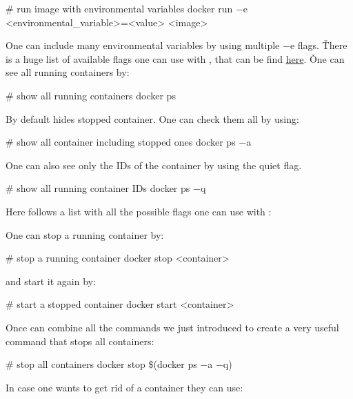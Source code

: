 \begin{bash}
# run image with environmental variables
docker run $-$e <environmental_variable>=<value> <image>
\end{bash}

One can include many environmental variables by using multiple $-$e flags. \v

There is a huge list of available flags one can use with , that can be find
\href{https://docs.docker.com/engine/reference/commandline/run/#options}{here}. \v

One can see all running containers by:

\begin{bash}
# show all running containers
docker ps
\end{bash}

By default  hides stopped container. One can check them all by using:

\begin{bash}
# show all container including stopped ones
docker ps $-$a
\end{bash}

One can also see only the IDs of the container by using the quiet  flag.

\begin{bash}
# show all running container IDs
docker ps $-$q
\end{bash}

Here follows a list with all the possible flags one can use with :


One can stop a running container by:

\begin{bash}
# stop a running container
docker stop <container>
\end{bash}

and start it again by:

\begin{bash}
# start a stopped container
docker start <container>
\end{bash}

Once can combine all the commands we just introduced to create a very useful command that stops all containers:

\begin{bash}
# stop all containers
docker stop $\$$(docker ps $-$a $-$q)
\end{bash}

In case one wants to get rid of a container they can use:

